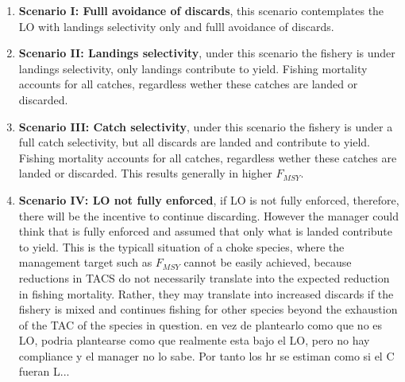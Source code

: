 \documentclass[12pt,oneline,a4paper,numbib]{ouparticle}
\begin{document}
\begin{enumerate}

\item
\textbf{Scenario I: Fulll avoidance of discards}, this scenario contemplates the LO with landings selectivity only and fulll avoidance of discards.

\item
\textbf{Scenario II: Landings selectivity},  under this scenario the fishery is under landings selectivity, only landings contribute to yield. Fishing mortality accounts for all catches, regardless wether these catches are landed or discarded. 

\item
\textbf{Scenario III: Catch selectivity},  under this scenario the fishery is under a full catch selectivity, but all discards are landed and contribute to yield. Fishing mortality accounts for all catches, regardless wether these catches are landed or discarded. This results generally in higher $F_{MSY}$.

\item 
\textbf{Scenario IV: LO not fully enforced}, if LO is not fully enforced, therefore, there will be the incentive to continue discarding. However the manager could think that is fully enforced and assumed that only what is landed contribute to yield. This is the typicall situation of a choke species, where the management target such as $F_{MSY}$ cannot be easily achieved, because reductions in TACS do not necessarily translate into the expected reduction in fishing mortality. Rather, they may translate into increased discards if the fishery is mixed and continues fishing for other species beyond the exhaustion of the TAC of the species in question.
en vez de plantearlo como que no es LO, podria plantearse como que realmente esta bajo el LO, pero no hay compliance y el manager no lo sabe. Por tanto los hr se estiman como si el C fueran L...


\end{enumerate}
\end{document}
